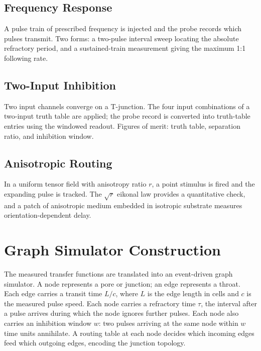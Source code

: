 \subsection{Frequency Response}
\label{sec:meth_exp_frequency}

A pulse train of prescribed frequency is injected and the probe records which pulses transmit.
Two forms: a two-pulse interval sweep locating the absolute refractory period, and a sustained-train measurement giving the maximum 1:1 following rate.

\subsection{Two-Input Inhibition}
\label{sec:meth_exp_logic}

Two input channels converge on a T-junction.
The four input combinations of a two-input truth table are applied; the probe record is converted into truth-table entries using the windowed readout.
Figures of merit: truth table, separation ratio, and inhibition window.

\subsection{Anisotropic Routing}
\label{sec:meth_exp_anisotropy}

In a uniform tensor field with anisotropy ratio $r$, a point stimulus is fired and the expanding pulse is tracked.
The $\sqrt{r}$ eikonal law provides a quantitative check, and a patch of anisotropic medium embedded in isotropic substrate measures orientation-dependent delay.

\section{Graph Simulator Construction}
\label{sec:meth_graph}

The measured transfer functions are translated into an event-driven graph simulator.
A node represents a pore or junction; an edge represents a throat.
Each edge carries a transit time $L/c$, where $L$ is the edge length in cells and $c$ is the measured pulse speed.
Each node carries a refractory time $\tau$, the interval after a pulse arrives during which the node ignores further pulses.
Each node also carries an inhibition window $w$: two pulses arriving at the same node within $w$ time units annihilate.
A routing table at each node decides which incoming edges feed which outgoing edges, encoding the junction topology.

